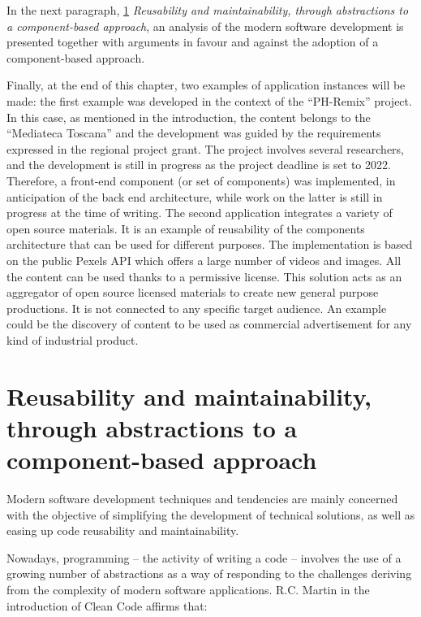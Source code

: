 In the next paragraph, \ref{sec:reuseAndMaintainability} \emph{Reusability and maintainability, through abstractions to a component-based approach}, an analysis of the modern software development is presented together with arguments in favour and against the adoption of a component-based approach.

Finally, at the end of this chapter, two examples of application instances will be made: the first example was developed in the context of the “PH-Remix” project. In this case, as mentioned in the introduction, the content belongs to the “Mediateca Toscana” and the development was guided by the requirements expressed in the regional project grant. The project involves several researchers, and the development is still in progress as the project deadline is set to 2022. Therefore, a front-end component (or set of components) was implemented, in anticipation of the back end architecture, while work on the latter is still in progress at the time of writing.
The second application integrates a variety of open source materials. It is an example of reusability of the components architecture that can be used for different purposes. The implementation is based on the public Pexels API which offers a large number of videos and images. All the content can be used thanks to a permissive license. This solution acts as an aggregator of open source licensed materials to create new general purpose productions. It is not connected to any specific target audience. An example could be the discovery of content to be used as commercial advertisement for any kind of industrial product.

\section{Reusability and maintainability, through abstractions to a component-based approach}
\label{sec:reuseAndMaintainability}

Modern software development techniques and tendencies are mainly concerned with the objective of simplifying the development of technical solutions, as well as easing up code reusability and maintainability.

Nowadays, programming – the activity of writing a code – involves the use of a growing number of abstractions as a way of responding to the challenges deriving from the complexity of modern software applications. R.C. Martin in the introduction of Clean Code affirms that:

